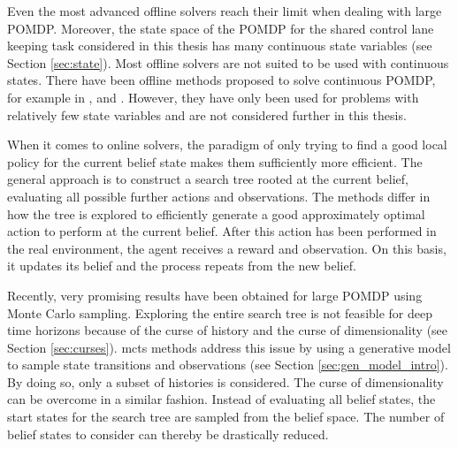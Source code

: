 Even the most advanced offline solvers reach their limit when dealing with large POMDP. Moreover, the state space of the POMDP for the shared control lane keeping task considered in this thesis has many continuous state variables (see Section \ref{sec:state}). Most offline solvers are not suited to be used with continuous states. There have been offline methods proposed to solve continuous POMDP, for example in \cite{pomdp-cont-offline}, and \cite{pomdp-cont-offline-2}. However, they have only been used for problems with relatively few state variables and are not considered further in this thesis. 

When it comes to online solvers, the paradigm of only trying to find a good local policy for the current belief state makes them sufficiently more efficient. The general approach is to construct a search tree rooted at the current belief, evaluating all possible further actions and observations. The methods differ in how the tree is explored to efficiently generate a good approximately optimal action to perform at the current belief. After this action has been performed in the real environment, the agent receives a reward and observation. On this basis, it updates its belief and the process repeats from the new belief. 

Recently, very promising results have been obtained for large POMDP using Monte Carlo sampling. Exploring the entire search tree is not feasible for deep time horizons because of the curse of history and the curse of dimensionality (see Section \ref{sec:curses}). \gls{mcts} methods address this issue by using a generative model to sample state transitions and observations (see Section \ref{sec:gen_model_intro}). By doing so, only a subset of histories is considered. The curse of dimensionality can be overcome in a similar fashion. Instead of evaluating all belief states, the start states for the search tree are sampled from the belief space. The number of belief states to consider can thereby be drastically reduced. 



